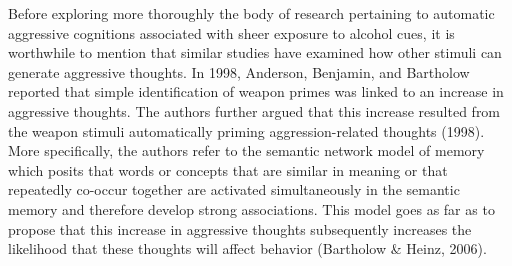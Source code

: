 \documentclass[authordate, serif, review]{jote-article}
\begin{document}
\begin{multicols}{2}
Before exploring more thoroughly the body of research pertaining to automatic aggressive cognitions associated with sheer exposure to alcohol cues, it is worthwhile to mention that similar studies have examined how other stimuli can generate aggressive thoughts. In 1998, Anderson, Benjamin, and Bartholow reported that simple identification of weapon primes was linked to an increase in aggressive thoughts. The authors further argued that this increase resulted from the weapon stimuli automatically priming aggression-related thoughts (1998). More specifically, the authors refer to the semantic network model of memory which posits that words or concepts that are similar in meaning or that repeatedly co-occur together are activated simultaneously in the semantic memory and therefore develop strong associations. This model goes as far as to propose that this increase in aggressive thoughts subsequently increases the likelihood that these thoughts will affect behavior (Bartholow \& Heinz, 2006). 


\end{multicols}
\end{document}
